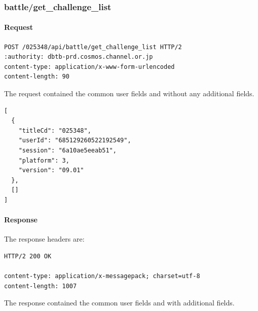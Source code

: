 \subsubsection{battle/get\_challenge\_list}
\label{subsec:api_battle_get_challenge_list}

\paragraph{Request}

\begin{lstlisting}
POST /025348/api/battle/get_challenge_list HTTP/2
:authority: dbtb-prd.cosmos.channel.or.jp
content-type: application/x-www-form-urlencoded
content-length: 90
\end{lstlisting}

The request contained the common user fields and without any additional fields.

\begin{lstlisting}
[
  {
    "titleCd": "025348",
    "userId": "685129260522192549",
    "session": "6a10ae5eeab51",
    "platform": 3,
    "version": "09.01"
  },
  []
]
\end{lstlisting}

\paragraph{Response}

The response headers are:

\begin{lstlisting}
HTTP/2 200 OK

content-type: application/x-messagepack; charset=utf-8
content-length: 1007
\end{lstlisting}

The response contained the common user fields and with additional fields.

